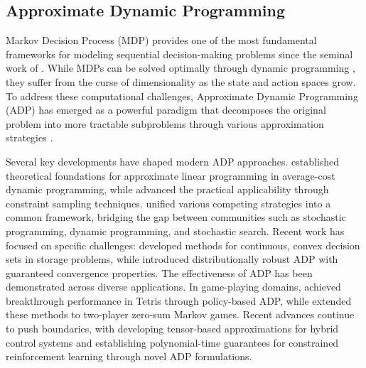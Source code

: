 \subsection{Approximate Dynamic Programming}\label{sec:related_sdm}
Markov Decision Process (MDP) provides one of the most fundamental frameworks for modeling sequential decision-making problems since the seminal work of \citet{bellman1957markovian}. While MDPs can be solved optimally through dynamic programming \citep{bellman1966dynamic}, they suffer from the curse of dimensionality as the state and action spaces grow. To address these computational challenges, Approximate Dynamic Programming (ADP) has emerged as a powerful paradigm that decomposes the original problem into more tractable subproblems through various approximation strategies \citep{powell2007approximate, bertsekas2024course}.

Several key developments have shaped modern ADP approaches. \citet{roy2002approximate} established theoretical foundations for approximate linear programming in average-cost dynamic programming, while \citet{de2004constraint} advanced the practical applicability through constraint sampling techniques. \citet{powell2014clearing} unified various competing strategies into a common framework, bridging the gap between communities such as stochastic programming, dynamic programming, and stochastic search. Recent work has focused on specific challenges: \citet{hannah2011approximate} developed methods for continuous, convex decision sets in storage problems, while \citet{petrik2012approximate} introduced distributionally robust ADP with guaranteed convergence properties. The effectiveness of ADP has been demonstrated across diverse applications. In game-playing domains, \citet{gabillon2013approximate} achieved breakthrough performance in Tetris through policy-based ADP, while \citet{perolat2015approximate} extended these methods to two-player zero-sum Markov games. Recent advances continue to push boundaries, with \citet{shetty2024generalized} developing tensor-based approximations for hybrid control systems and \citet{mcmahan2024deterministic} establishing polynomial-time guarantees for constrained reinforcement learning through novel ADP formulations.

